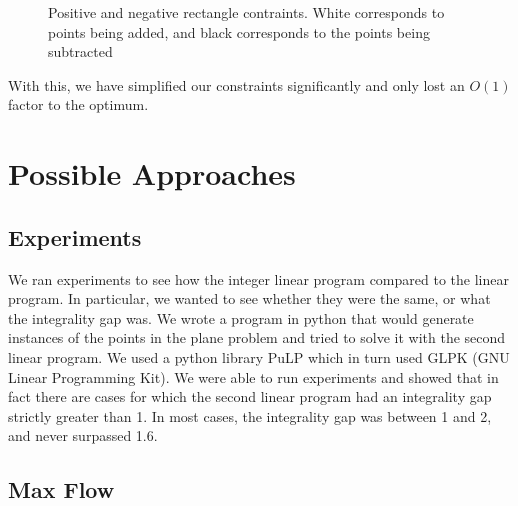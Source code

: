\documentclass[11pt]{article}
\begin{document}
\begin{figure}
\centering
{}
\caption{Positive and negative rectangle contraints. White corresponds to points being added, and black corresponds to the points being subtracted}
\label{fig:rectangles}
\end{figure}

With this, we have simplified our constraints significantly and only lost an $O(1)$ factor to the optimum.

\section{Possible Approaches}

\subsection{Experiments}

We ran experiments to see how the integer linear program compared to the linear program. In particular, we wanted to see whether they were the same, or what the integrality gap was. We wrote a program in python that would generate instances of the points in the plane problem and tried to solve it with the second linear program. We used a python library PuLP which in turn used GLPK (GNU Linear Programming Kit). We were able to run experiments and showed that in fact there are cases for which the second linear program had an integrality gap strictly greater than 1. In most cases, the integrality gap was between 1 and 2, and never surpassed 1.6.

\subsection{Max Flow}
\end{document}
